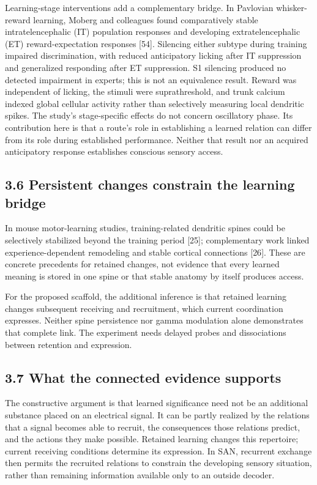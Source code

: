 \documentclass[
  american,
  11pt,
  letterpaper,
]{article}
\begin{document}
Learning-stage interventions add a complementary bridge. In Pavlovian whisker-reward learning, Moberg and colleagues found comparatively stable intratelencephalic (IT) population responses and developing extratelencephalic (ET) reward-expectation responses {[}54{]}. Silencing either subtype during training impaired discrimination, with reduced anticipatory licking after IT suppression and generalized responding after ET suppression. S1 silencing produced no detected impairment in experts; this is not an equivalence result. Reward was independent of licking, the stimuli were suprathreshold, and trunk calcium indexed global cellular activity rather than selectively measuring local dendritic spikes. The study's stage-specific effects do not concern oscillatory phase. Its contribution here is that a route's role in establishing a learned relation can differ from its role during established performance. Neither that result nor an acquired anticipatory response establishes conscious sensory access.

\subsection{3.6 Persistent changes constrain the learning bridge}\label{persistent-changes-constrain-the-learning-bridge}

In mouse motor-learning studies, training-related dendritic spines could be selectively stabilized beyond the training period {[}25{]}; complementary work linked experience-dependent remodeling and stable cortical connections {[}26{]}. These are concrete precedents for retained changes, not evidence that every learned meaning is stored in one spine or that stable anatomy by itself produces access.

For the proposed scaffold, the additional inference is that retained learning changes subsequent receiving and recruitment, which current coordination expresses. Neither spine persistence nor gamma modulation alone demonstrates that complete link. The experiment needs delayed probes and dissociations between retention and expression.

\subsection{3.7 What the connected evidence supports}\label{what-the-connected-evidence-supports}

The constructive argument is that learned significance need not be an additional substance placed on an electrical signal. It can be partly realized by the relations that a signal becomes able to recruit, the consequences those relations predict, and the actions they make possible. Retained learning changes this repertoire; current receiving conditions determine its expression. In SAN, recurrent exchange then permits the recruited relations to constrain the developing sensory situation, rather than remaining information available only to an outside decoder.
\end{document}
